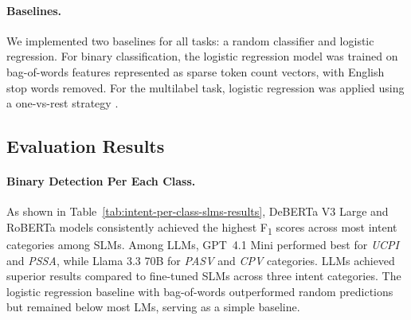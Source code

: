 \documentclass[11pt]{article}
\begin{document}

\paragraph{Baselines.}

We implemented two baselines for all tasks: a random classifier and logistic regression. For binary classification, the logistic regression model was trained on bag-of-words features represented as sparse token count vectors, with English stop words removed. For the multilabel task, logistic regression was applied using a one-vs-rest strategy \cite{murphy2018machine}.


\subsection{Evaluation Results}
\paragraph{Binary Detection Per Each Class.}

As shown in Table~\ref{tab:intent-per-class-slms-results}, DeBERTa V3 Large and RoBERTa models consistently achieved the highest F\textsubscript{1} scores across most intent categories among SLMs.
Among LLMs, \mbox{GPT 4.1} Mini performed best for \textit{UCPI} and \textit{PSSA}, while Llama 3.3 70B for \textit{PASV} and \textit{CPV} categories. LLMs achieved superior results compared to fine-tuned SLMs across three intent categories. 
The logistic regression baseline with bag-of-words outperformed random predictions but remained below most LMs, serving as a simple baseline.
\end{document}
